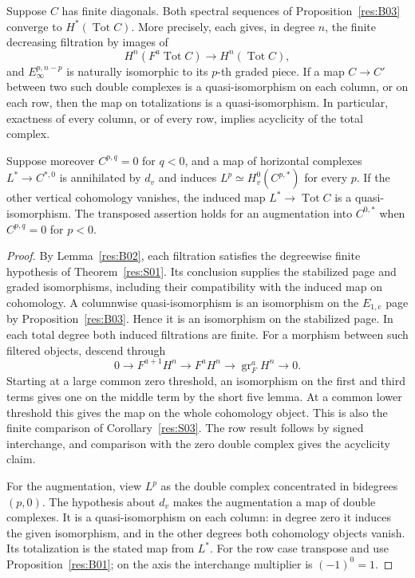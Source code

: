 \begin{theorem}
\label{res:B04}
Suppose \(C\) has finite diagonals. Both spectral sequences of
Proposition~\ref{res:B03} converge to \(H^*(\operatorname{Tot}C)\).
More precisely, each gives, in degree \(n\), the finite decreasing
filtration by images of
\[
  H^n(F^a\operatorname{Tot}C)\longrightarrow H^n(\operatorname{Tot}C),
\]
and \(E_\infty^{p,n-p}\) is naturally isomorphic to its \(p\)-th graded
piece. If a map \(C\to C'\) between two such double complexes is a
quasi-isomorphism on each column, or on each row, then the map on
totalizations is a quasi-isomorphism. In particular, exactness of every
column, or of every row, implies acyclicity of the total complex.

Suppose moreover \(C^{p,q}=0\) for \(q<0\), and a map of horizontal
complexes \(L^*\to C^{*,0}\) is annihilated by \(d_v\) and induces
\(L^p\simeq H_v^0(C^{p,*})\) for every \(p\). If the other vertical
cohomology vanishes, the induced map \(L^*\to\operatorname{Tot}C\) is
a quasi-isomorphism. The transposed assertion holds for an augmentation
into \(C^{0,*}\) when \(C^{p,q}=0\) for \(p<0\).
\end{theorem}

\begin{proof}
By Lemma~\ref{res:B02}, each filtration satisfies the degreewise finite
hypothesis of Theorem~\ref{res:S01}. Its conclusion supplies the
stabilized page and graded isomorphisms, including their compatibility
with the induced map on cohomology. A columnwise quasi-isomorphism is an
isomorphism on the \(E_{1,\mathrm c}\) page by
Proposition~\ref{res:B03}. Hence it is an isomorphism on the stabilized
page. In each total degree both induced filtrations are finite.
For a morphism between such filtered objects, descend through
\[
    0\longrightarrow F^{a+1}H^n
      \longrightarrow F^aH^n
      \longrightarrow \operatorname{gr}_F^a H^n
      \longrightarrow 0 .
\]
Starting at a large common zero threshold, an isomorphism on the first
and third terms gives one on the middle term by the short five lemma.
At a common lower threshold this gives the map on the whole cohomology
object. This is also the finite comparison of
Corollary~\ref{res:S03}. The row result follows by signed interchange,
and comparison with the zero double complex gives the acyclicity claim.

For the augmentation, view \(L^p\) as the double complex concentrated
in bidegrees \((p,0)\). The hypothesis about \(d_v\) makes the
augmentation a map of double complexes. It is a quasi-isomorphism on
each column: in degree zero it induces the given isomorphism, and in
the other degrees both cohomology objects vanish. Its totalization is
the stated map from \(L^*\). For the row case transpose and use
Proposition~\ref{res:B01}; on the axis the interchange multiplier is
\((-1)^0=1\).
\end{proof}


